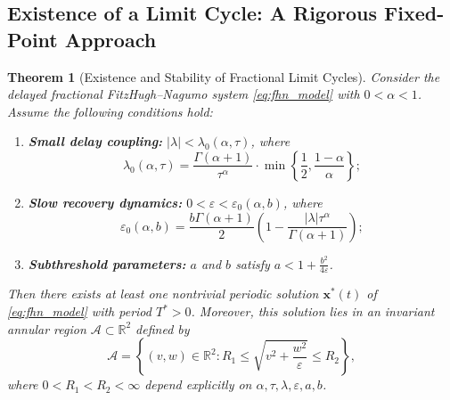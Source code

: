 \documentclass[12pt,a4paper]{article}
\newtheorem{theorem}{Theorem}[section]
\numberwithin{equation}{section}
\begin{document}
\subsection*{Existence of a Limit Cycle: A Rigorous Fixed-Point Approach}
\begin{theorem}[Existence and Stability of Fractional Limit Cycles]
	\label{thm:limit_cycle}
	Consider the delayed fractional FitzHugh--Nagumo system \eqref{eq:fhn_model} with $0<\alpha<1$. 
	Assume the following conditions hold:
	\begin{enumerate}
		\item \textbf{Small delay coupling:} $|\lambda| < \lambda_0(\alpha, \tau)$, where
		\begin{equation}
			\lambda_0(\alpha, \tau) = \frac{\Gamma(\alpha+1)}{\tau^\alpha} \cdot \min\left\{\frac{1}{2}, \frac{1-\alpha}{\alpha}\right\};
			\label{eq:lambda_condition}
		\end{equation}
		
		\item \textbf{Slow recovery dynamics:} $0 < \varepsilon < \varepsilon_0(\alpha, b)$, where
		\begin{equation}
			\varepsilon_0(\alpha, b) = \frac{b \Gamma(\alpha+1)}{2} \left(1 - \frac{|\lambda|\tau^\alpha}{\Gamma(\alpha+1)}\right);
			\label{eq:epsilon_condition}
		\end{equation}
		
		\item \textbf{Subthreshold parameters:} $a$ and $b$ satisfy $a < 1 + \frac{b^2}{4\varepsilon}$.
	\end{enumerate}
	Then there exists at least one nontrivial periodic solution $\mathbf{x}^*(t)$ of \eqref{eq:fhn_model} with period $T^* > 0$. Moreover, this solution lies in an invariant annular region $\mathcal{A} \subset \mathbb{R}^2$ defined by
	\begin{equation}
		\mathcal{A} = \left\{ (v,w) \in \mathbb{R}^2 : R_1 \leq \sqrt{v^2 + \frac{w^2}{\varepsilon}} \leq R_2 \right\},
		\label{eq:annular_region}
	\end{equation}
	where $0 < R_1 < R_2 < \infty$ depend explicitly on $\alpha, \tau, \lambda, \varepsilon, a, b$.
\end{theorem}
\end{document}
